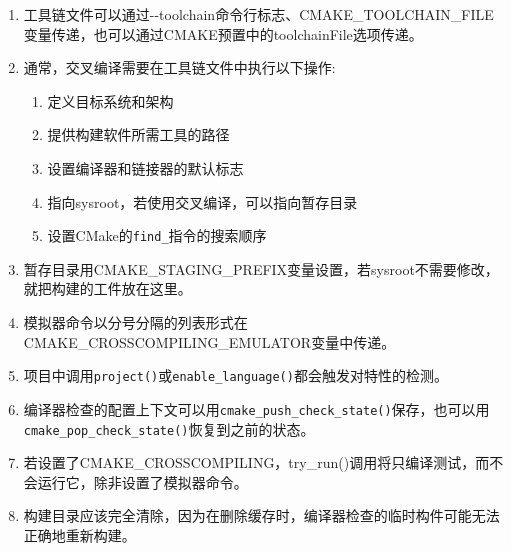 

\begin{enumerate}
\item 
工具链文件可以通过-{}-toolchain命令行标志、CMAKE\_TOOLCHAIN\_FILE变量传递，也可以通过CMAKE预置中的toolchainFile选项传递。

\item
通常，交叉编译需要在工具链文件中执行以下操作:

\begin{enumerate}[label=\Alph*]
\item
定义目标系统和架构
 
\item 
提供构建软件所需工具的路径

\item 
设置编译器和链接器的默认标志

\item 
指向sysroot，若使用交叉编译，可以指向暂存目录

\item 
设置CMake的\texttt{find\_}指令的搜索顺序
\end{enumerate}

\item 
暂存目录用CMAKE\_STAGING\_PREFIX变量设置，若sysroot不需要修改，就把构建的工件放在这里。

\item 
模拟器命令以分号分隔的列表形式在CMAKE\_CROSSCOMPILING\_EMULATOR变量中传递。

\item 
项目中调用\texttt{project()}或\texttt{enable\_language()}都会触发对特性的检测。

\item 
编译器检查的配置上下文可以用\texttt{cmake\_push\_check\_state()}保存，也可以用\texttt{cmake\_pop\_check\_state()}恢复到之前的状态。

\item 
若设置了CMAKE\_CROSSCOMPILING，try\_run()调用将只编译测试，而不会运行它，除非设置了模拟器命令。

\item 
构建目录应该完全清除，因为在删除缓存时，编译器检查的临时构件可能无法正确地重新构建。
\end{enumerate}